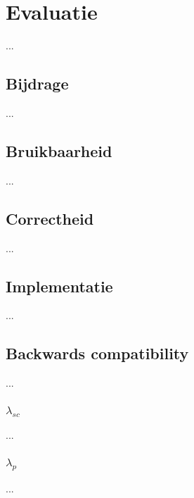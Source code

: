 \chapter{Evaluatie}
\label{hoofdstuk:evaluatie}
... 

\section{Bijdrage}
...

\section{Bruikbaarheid}
...

\section{Correctheid}
...

\section{Implementatie}
...

\section{Backwards compatibility}
...

\subsection{$\lambda_{sc}$}
...

\subsection{$\lambda_{p}$}
...

